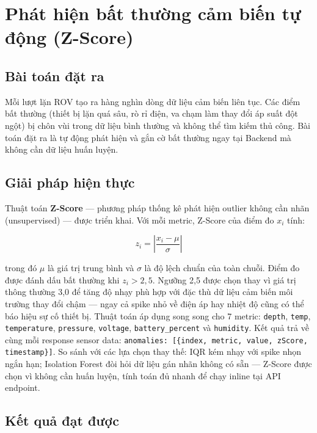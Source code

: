 \documentclass[../DoAn.tex]{subfiles}
\begin{document}
\section{Phát hiện bất thường cảm biến tự động (Z-Score)}
\label{section:7.8}

\subsection{Bài toán đặt ra}

Mỗi lượt lặn ROV tạo ra hàng nghìn dòng dữ liệu cảm biến liên tục. Các điểm bất thường (thiết bị lặn quá sâu, rò rỉ điện, va chạm làm thay đổi áp suất đột ngột) bị chôn vùi trong dữ liệu bình thường và không thể tìm kiếm thủ công. Bài toán đặt ra là tự động phát hiện và gắn cờ bất thường ngay tại Backend mà không cần dữ liệu huấn luyện.

\subsection{Giải pháp hiện thực}

Thuật toán \textbf{Z-Score} --- phương pháp thống kê phát hiện outlier không cần nhãn (unsupervised) --- được triển khai. Với mỗi metric, Z-Score của điểm đo $x_i$ tính:

\begin{equation}
z_i = \left| \frac{x_i - \mu}{\sigma} \right|
\label{eq:ch7-zscore}
\end{equation}

trong đó $\mu$ là giá trị trung bình và $\sigma$ là độ lệch chuẩn của toàn chuỗi. Điểm đo được đánh dấu bất thường khi $z_i > 2{,}5$. Ngưỡng 2,5 được chọn thay vì giá trị thông thường 3,0 để tăng độ nhạy phù hợp với đặc thù dữ liệu cảm biến môi trường thay đổi chậm --- ngay cả spike nhỏ về điện áp hay nhiệt độ cũng có thể báo hiệu sự cố thiết bị. Thuật toán áp dụng song song cho 7 metric: \texttt{depth}, \texttt{temp}, \texttt{temperature}, \texttt{pressure}, \texttt{voltage}, \texttt{battery\_percent} và \texttt{humidity}. Kết quả trả về cùng mỗi response sensor data: \texttt{anomalies: [\{index, metric, value, zScore, timestamp\}]}. So sánh với các lựa chọn thay thế: IQR kém nhạy với spike nhọn ngắn hạn; Isolation Forest đòi hỏi dữ liệu gán nhãn không có sẵn --- Z-Score được chọn vì không cần huấn luyện, tính toán đủ nhanh để chạy inline tại API endpoint.

\subsection{Kết quả đạt được}
\end{document}

